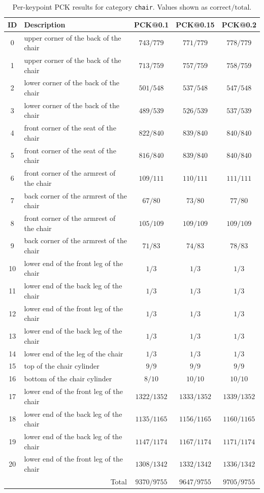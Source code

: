 \begin{table}[h]
\centering
\small
\caption{Per-keypoint PCK results for category \texttt{chair}. Values shown as $\text{correct}/\text{total}$.}
\label{tab:pck_chair}
\begin{tabular}{cl ccc}
\toprule
ID & Description & PCK@0.1 & PCK@0.15 & PCK@0.2 \\
\midrule
0 & upper corner of the back of the chair & $743/779$ & $771/779$ & $778/779$ \\
1 & upper corner of the back of the chair & $713/759$ & $757/759$ & $758/759$ \\
2 & lower corner of the back of the chair & $501/548$ & $537/548$ & $547/548$ \\
3 & lower corner of the back of the chair & $489/539$ & $526/539$ & $537/539$ \\
4 & front corner of the seat of the chair & $822/840$ & $839/840$ & $840/840$ \\
5 & front corner of the seat of the chair & $816/840$ & $839/840$ & $840/840$ \\
6 & front corner of the armrest of the chair & $109/111$ & $110/111$ & $111/111$ \\
7 & back corner of the armrest of the chair & $67/80$ & $73/80$ & $77/80$ \\
8 & front corner of the armrest of the chair & $105/109$ & $109/109$ & $109/109$ \\
9 & back corner of the armrest of the chair & $71/83$ & $74/83$ & $78/83$ \\
10 & lower end of the front leg of the chair & $1/3$ & $1/3$ & $1/3$ \\
11 & lower end of the back leg of the chair & $1/3$ & $1/3$ & $1/3$ \\
12 & lower end of the front leg of the chair & $1/3$ & $1/3$ & $1/3$ \\
13 & lower end of the back leg of the chair & $1/3$ & $1/3$ & $1/3$ \\
14 & lower end of the leg of the chair & $1/3$ & $1/3$ & $1/3$ \\
15 & top of the chair cylinder & $9/9$ & $9/9$ & $9/9$ \\
16 & bottom of the chair cylinder & $8/10$ & $10/10$ & $10/10$ \\
17 & lower end of the front leg of the chair & $1322/1352$ & $1333/1352$ & $1339/1352$ \\
18 & lower end of the back leg of the chair & $1135/1165$ & $1156/1165$ & $1160/1165$ \\
19 & lower end of the back leg of the chair & $1147/1174$ & $1167/1174$ & $1171/1174$ \\
20 & lower end of the front leg of the chair & $1308/1342$ & $1332/1342$ & $1336/1342$ \\
\midrule
\multicolumn{2}{r}{Total} & $9370/9755$ & $9647/9755$ & $9705/9755$ \\
\bottomrule
\end{tabular}
\end{table}

